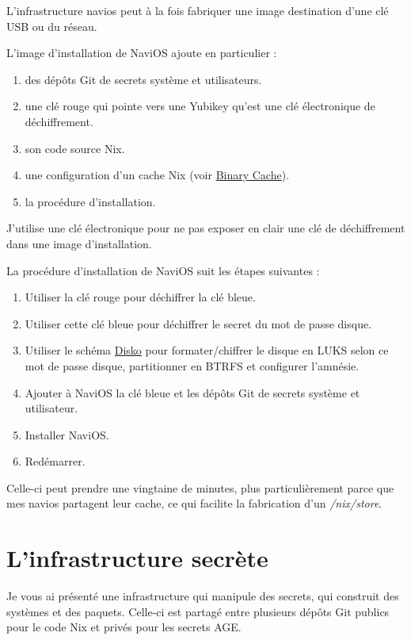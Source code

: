 \documentclass[a4paper,11pt]{article}
\begin{document}
\begin{blogmain}
L'infrastructure navios peut à la fois fabriquer une image destination d'une clé USB ou du réseau.

L'image d'installation de NaviOS ajoute en particulier :
\begin{enumerate}
  \item des dépôts Git de secrets système et utilisateurs.
  \item une clé rouge qui pointe vers une Yubikey qu'est une clé électronique de déchiffrement.
  \item son code source Nix.
  \item une configuration d'un cache Nix (voir \href{https://nixos.wiki/wiki/Binary_Cache}{Binary Cache}).
  \item la procédure d'installation.
\end{enumerate}

J'utilise une clé électronique pour ne pas exposer en clair une clé de déchiffrement dans une image d'installation.

La procédure d'installation de NaviOS suit les étapes suivantes :
\begin{enumerate}
  \item Utiliser la clé rouge pour déchiffrer la clé bleue.
  \item Utiliser cette clé bleue pour déchiffrer le secret du mot de passe disque.
  \item Utiliser le schéma \href{https://github.com/nix-community/disko}{Disko} pour formater/chiffrer le disque en LUKS selon ce mot de passe disque, partitionner en BTRFS et configurer l'amnésie.
  \item Ajouter à NaviOS la clé bleue et les dépôts Git de secrets système et utilisateur.
  \item Installer NaviOS.
  \item Redémarrer.
\end{enumerate}

Celle-ci peut prendre une vingtaine de minutes, plus particulièrement parce que mes navios partagent leur cache, ce qui facilite la fabrication d'un \textit{/nix/store}.

\section{L'infrastructure secrète}
Je vous ai présenté une infrastructure qui manipule des secrets, qui construit des systèmes et des paquets.
Celle-ci est partagé entre plusieurs dépôts Git publics pour le code Nix et privés pour les secrets AGE.


\end{blogmain}
\end{document}
